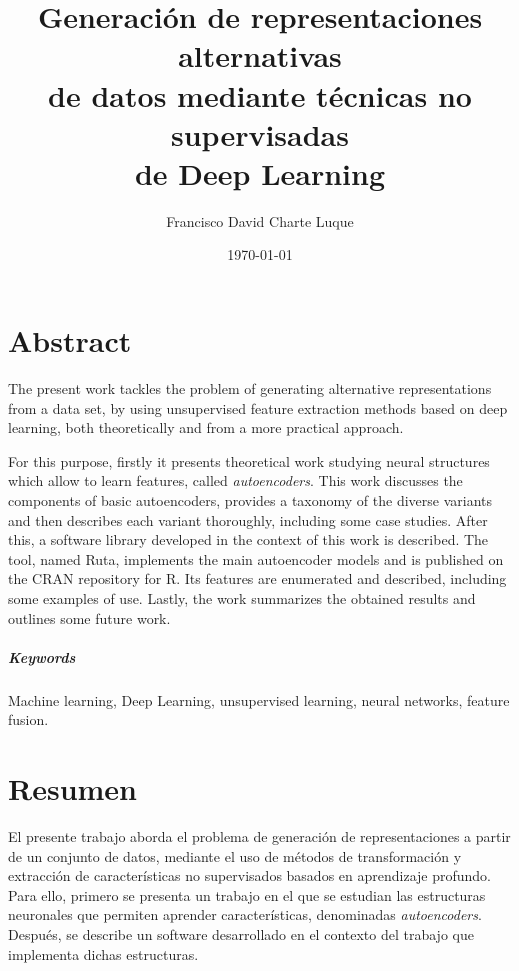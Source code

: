 \documentclass[oneside,openright,titlepage,numbers=noenddot,openany,headinclude,footinclude=true,
cleardoublepage=empty,abstractoff,BCOR=5mm,paper=a4,fontsize=12pt,main=spanish]{scrreprt}
\author{Francisco David Charte Luque}
\date{\today}
\title{Generación de representaciones alternativas\\de datos mediante técnicas no supervisadas\\de Deep Learning}
\begin{document}
\maketitle
\tableofcontents

\clearpage

\chapter*{Abstract}

The present work tackles the problem of generating alternative representations from a data set, by using unsupervised feature extraction methods based on deep learning, both theoretically and from a more practical approach.

For this purpose, firstly it presents theoretical work studying neural structures which allow to learn features, called \textit{autoencoders}. This work discusses the components of basic autoencoders, provides a taxonomy of the diverse variants and then describes each variant thoroughly, including some case studies. After this, a software library developed in the context of this work is described. The tool, named Ruta, implements the main autoencoder models and is published on the CRAN repository for R. Its features are enumerated and described, including some examples of use. Lastly, the work summarizes the obtained results and outlines some future work. 

\paragraph{Keywords} Machine learning, Deep Learning, unsupervised learning, neural networks, feature fusion.

\chapter*{Resumen}

El presente trabajo aborda el problema de generación de representaciones a partir de un conjunto de datos, mediante el uso de métodos de transformación y extracción de características no supervisados basados en aprendizaje profundo. Para ello, primero se presenta un trabajo en el que se estudian las estructuras neuronales que permiten aprender características, denominadas \textit{autoencoders}. Después, se describe un software desarrollado en el contexto del trabajo que implementa dichas estructuras.
\end{document}
